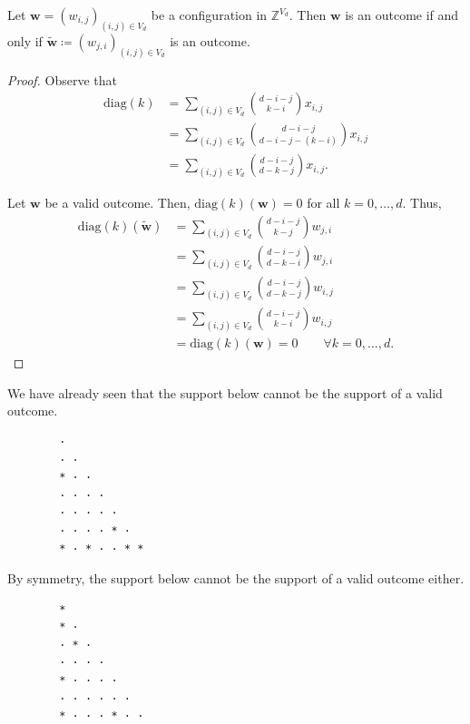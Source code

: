 \begin{proposition}\label{prop:symmetry}
    Let \( \mathbf{w} = (w_{i,j})_{(i,j) \in V_d} \) be a configuration in \( \mathbb{Z}^{V_d} \). Then \( \mathbf{w} \) is an outcome if and only if \(  \tilde{\mathbf{w}} \coloneqq (w_{j,i})_{(i,j) \in V_d} \) is an outcome.
\end{proposition}

\begin{proof}
    Observe that
    \begin{align*}
        \mathrm{diag}(k)  &= \sum_{(i,j) \in V_d}\binom{d - i - j}{k-i} x_{i,j}\\ 
        &= \sum_{(i,j) \in V_d}\binom{d - i - j}{d-i-j-(k-i)} x_{i,j}\\
        &= \sum_{(i,j) \in V_d}\binom{d - i - j}{d-k-j} x_{i,j}.
    \end{align*}

    Let \( \mathbf{w} \) be a valid outcome. Then, \( \mathrm{diag}(k)(\mathbf{w}) = 0 \) for all \( k = 0, \dots, d \). Thus, 
    \begin{align*}
        \mathrm{diag}(k)(\tilde{\mathbf{w}}) &= \sum_{(i,j) \in V_d}\binom{d - i - j}{k-j} w_{j,i} \\
        &= \sum_{(i,j) \in V_d}\binom{d - i - j}{d-k-i} w_{j,i}\\
        &= \sum_{(i,j) \in V_d}\binom{d - i - j}{d-k-j} w_{i,j} \\
        &= \sum_{(i,j) \in V_d}\binom{d - i - j}{k-i} w_{i,j} \\
        &= \mathrm{diag}(k)(\mathbf w) = 0 \qquad \forall k = 0, \dots, d.
    \end{align*}
\end{proof}

\begin{example}
    We have already seen that the support below cannot be the support of a valid outcome.
    \begin{verbatim}
        · 
        · · 
        * · · 
        · · · · 
        · · · · · 
        · · · · * · 
        * · * · · * *
    \end{verbatim}
    By symmetry, the support below cannot be the support of a valid outcome either.
    \begin{verbatim}
        * 
        * · 
        · * · 
        · · · · 
        * · · · · 
        · · · · · · 
        * · · · * · ·
    \end{verbatim}
\end{example}

